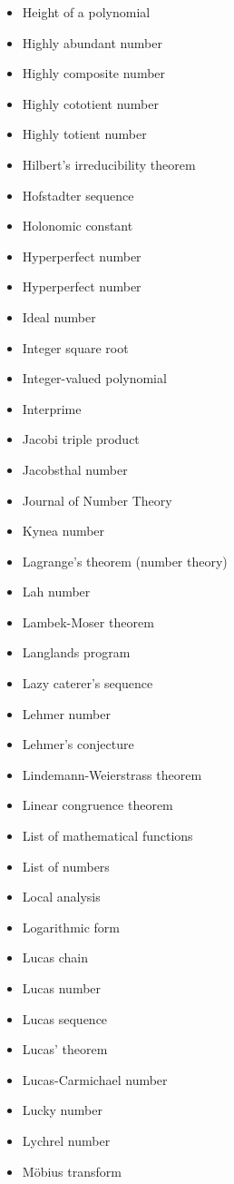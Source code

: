 \documentclass[12pt]{article}
\begin{document}
\begin{itemize}
\item Height of a polynomial 
\item Highly abundant number 
\item Highly composite number 
\item Highly cototient number 
\item Highly totient number 
\item Hilbert's irreducibility theorem 
\item Hofstadter sequence 
\item Holonomic constant 
\item Hyperperfect number 
\item Hyperperfect number 
\item Ideal number 
\item Integer square root 
\item Integer-valued polynomial 
\item Interprime 
\item Jacobi triple product 
\item Jacobsthal number 
\item Journal of Number Theory 
\item Kynea number 
\item Lagrange's theorem (number theory) 
\item Lah number 
\item Lambek-Moser theorem 
\item Langlands program 
\item Lazy caterer's sequence 
\item Lehmer number 
\item Lehmer's conjecture 
\item Lindemann-Weierstrass theorem 
\item Linear congruence theorem 
\item List of mathematical functions 
\item List of numbers 
\item Local analysis 
\item Logarithmic form 
\item Lucas chain 
\item Lucas number 
\item Lucas sequence 
\item Lucas' theorem 
\item Lucas-Carmichael number 
\item Lucky number 
\item Lychrel number 
\item M\"obius transform 

\end{itemize}
\end{document}
